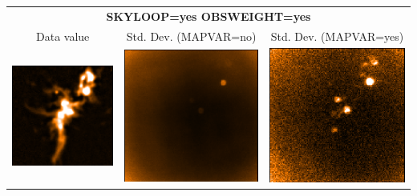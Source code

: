 \vspace{5mm}
\begin{tabular}{|ccc|}
\hline
\multicolumn{3}{|c|}{\textbf{SKYLOOP=yes OBSWEIGHT=yes}} \\
Data value & Std. Dev. (MAPVAR=no) & Std. Dev. (MAPVAR=yes) \\
\includegraphics[width=\picwid]{tailoring/i4.png} &
\includegraphics[width=\picwid]{tailoring/sqvar4.png} &
\includegraphics[width=\picwid]{tailoring/disp4.png} \\
\hline
\end{tabular}

